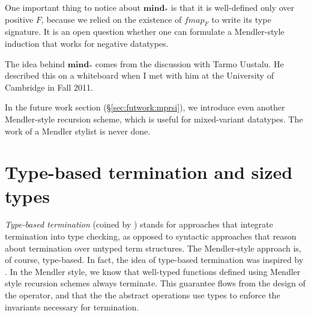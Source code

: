 One important thing to notice about $\textbf{mind}_{*}$ is that
it is well-defined only over positive $F$, because we relied on
the existence of $\textit{fmap}_F$ to write its type signature.
It is an open question whether one can formulate a Mendler-style induction
that works for negative datatypes.

The idea behind $\textbf{mind}_{*}$ comes from
the discussion with Tarmo Uustalu. He described this on a whiteboard
when I met with him at the University of Cambridge in Fall 2011.

In the future work section (\S\ref{sec:futwork:mprsi}), we introduce 
even another Mendler-style
recursion scheme, which is useful for mixed-variant datatypes.
The work of a Mendler stylist is never done.



\section{Type-based termination and sized types}
\emph{Type-based termination} (coined by \citet{BartheFGPU04}) stands for
approaches that integrate termination into type checking, as opposed to
syntactic approaches that reason about termination over untyped term structures.
The Mendler-style approach is, of course, type-based.  In fact, the idea of
type-based termination was inspired by \citet{Mendler87,Mendler91}.
In the Mendler style, we know that well-typed functions defined using
Mendler style recursion schemes always terminate.
This guarantee flows from the design
of the operator, and that the the abstract operations
use types to enforce the invariants necessary for termination.

